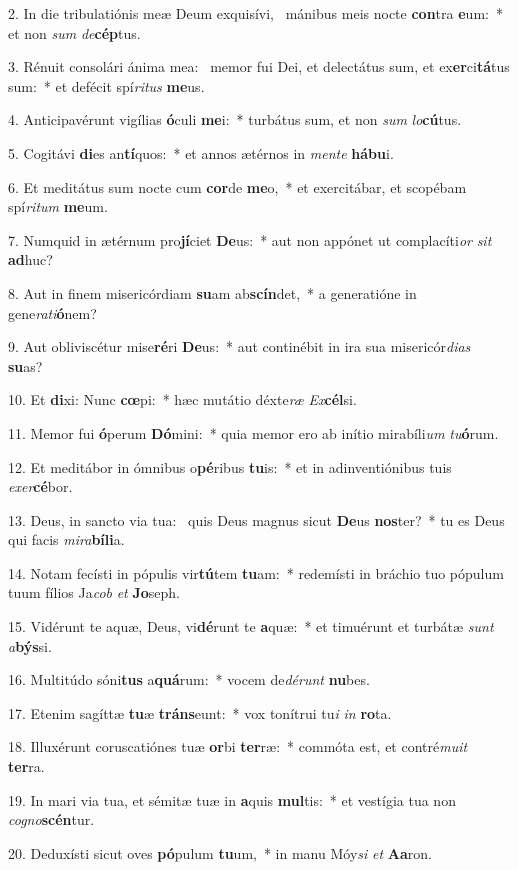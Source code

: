 2. In die tribulatiónis meæ Deum exquisívi, \dag\  mánibus meis nocte \textbf{con}tra \textbf{e}um:~*  et non \textit{sum} \textit{de}\textbf{cép}tus.\

3. Rénuit consolári ánima mea: \dag\  memor fui Dei, et delectátus sum, et ex\textbf{er}ci\textbf{tá}tus sum:~*  et defécit spí\textit{ri}\textit{tus} \textbf{me}us.\

4. Anticipavérunt vigílias \textbf{ó}culi \textbf{me}i:~*  turbátus sum, et non \textit{sum} \textit{lo}\textbf{cú}tus.\

5. Cogitávi \textbf{di}es an\textbf{tí}quos:~*  et annos ætérnos in \textit{men}\textit{te} \textbf{há}\textbf{bu}i.\

6. Et meditátus sum nocte cum \textbf{cor}de \textbf{me}o,~*  et exercitábar, et scopébam spí\textit{ri}\textit{tum} \textbf{me}um.\

7. Numquid in ætérnum pro\textbf{jí}ciet \textbf{De}us:~*  aut non appónet ut complacíti\textit{or} \textit{sit} \textbf{ad}huc?\

8. Aut in finem misericórdiam \textbf{su}am ab\textbf{scín}det,~*  a generatióne in gene\textit{ra}\textit{ti}\textbf{ó}nem?\

9. Aut obliviscétur mise\textbf{ré}ri \textbf{De}us:~*  aut continébit in ira sua misericór\textit{di}\textit{as} \textbf{su}as?\

10. Et \textbf{di}xi: Nunc \textbf{cœ}pi:~*  hæc mutátio déxte\textit{ræ} \textit{Ex}\textbf{cél}si.\

11. Memor fui \textbf{ó}perum \textbf{Dó}mini:~*  quia memor ero ab inítio mirabíli\textit{um} \textit{tu}\textbf{ó}rum.\

12. Et meditábor in ómnibus o\textbf{pé}ribus \textbf{tu}is:~*  et in adinventiónibus tuis \textit{ex}\textit{er}\textbf{cé}bor.\

13. Deus, in sancto via tua: \dag\  quis Deus magnus sicut \textbf{De}us \textbf{nos}ter?~*  tu es Deus qui facis \textit{mi}\textit{ra}\textbf{bí}\textbf{li}a.\

14. Notam fecísti in pópulis vir\textbf{tú}tem \textbf{tu}am:~*  redemísti in bráchio tuo pópulum tuum fílios Ja\textit{cob} \textit{et} \textbf{Jo}seph.\

15. Vidérunt te aquæ, Deus, vi\textbf{dé}runt te \textbf{a}quæ:~*  et timuérunt et turbátæ \textit{sunt} \textit{a}\textbf{býs}si.\

16. Multitúdo sóni\textbf{tus} a\textbf{quá}rum:~*  vocem de\textit{dé}\textit{runt} \textbf{nu}bes.\

17. Etenim sagíttæ \textbf{tu}æ \textbf{tráns}eunt:~*  vox tonítrui tu\textit{i} \textit{in} \textbf{ro}ta.\

18. Illuxérunt coruscatiónes tuæ \textbf{or}bi \textbf{ter}ræ:~*  commóta est, et contré\textit{mu}\textit{it} \textbf{ter}ra.\

19. In mari via tua, et sémitæ tuæ in \textbf{a}quis \textbf{mul}tis:~*  et vestígia tua non \textit{co}\textit{gno}\textbf{scén}tur.\

20. Deduxísti sicut oves \textbf{pó}pulum \textbf{tu}um,~*  in manu Móy\textit{si} \textit{et} \textbf{A}\textbf{a}ron.\

